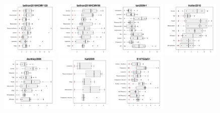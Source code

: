 \documentclass[12pt]{article}\usepackage[]{graphicx}\usepackage[]{color}
\begin{document}
\begin{figure}[p]
  \includegraphics[width = 0.24\textwidth]{./figure/allqseps-13.pdf}
  \includegraphics[width = 0.24\textwidth]{./figure/allqseps-14.pdf}
  \includegraphics[width = 0.24\textwidth]{./figure/allqseps-15.pdf}
  \includegraphics[width = 0.24\textwidth]{./figure/allqseps-16.pdf}
  \includegraphics[width = 0.24\textwidth]{./figure/allqseps-17.pdf}
  \includegraphics[width = 0.24\textwidth]{./figure/allqseps-18.pdf}
  \includegraphics[width = 0.24\textwidth]{./figure/allqseps-19.pdf}

\end{figure}
\end{document}
